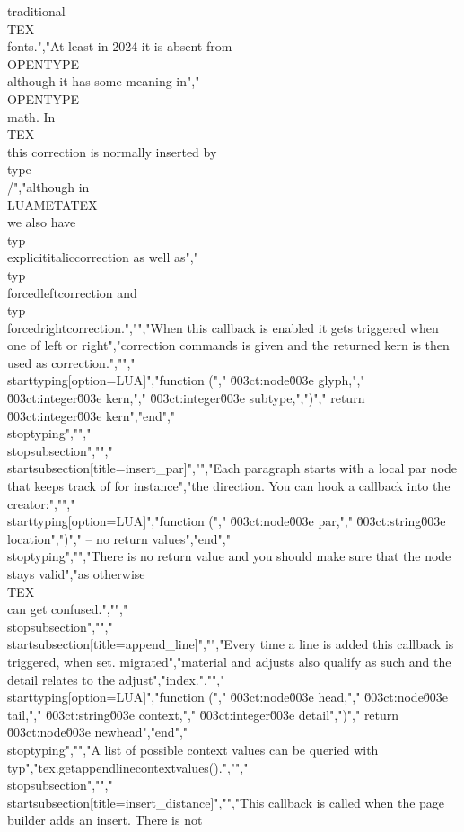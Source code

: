 traditional \\TEX\\ fonts.","At least in 2024 it is absent from \\OPENTYPE\\ although it has some meaning in","\\OPENTYPE\\ math. In \\TEX\\ this correction is normally inserted by \\type {\\/}","although in \\LUAMETATEX\\ we also have \\typ {\\explicititaliccorrection} as well as","\\typ {\\forcedleftcorrection} and \\typ {\\forcedrightcorrection}.","","When this callback is enabled it gets triggered when one of left or right","correction commands is given and the returned kern is then used as correction.","","\\starttyping[option=LUA]","function (","    \u003ct:node\u003e    glyph,","    \u003ct:integer\u003e kern,","    \u003ct:integer\u003e subtype,",")","    return \u003ct:integer\u003e kern","end","\\stoptyping","","\\stopsubsection","","\\startsubsection[title=insert_par]","","Each paragraph starts with a local par node that keeps track of for instance","the direction. You can hook a callback into the creator:","","\\starttyping[option=LUA]","function (","    \u003ct:node\u003e   par,","    \u003ct:string\u003e location",")","    -- no return values","end","\\stoptyping","","There is no return value and you should make sure that the node stays valid","as otherwise \\TEX\\ can get confused.","","\\stopsubsection","","\\startsubsection[title=append_line]","","Every time a line is added this callback is triggered, when set. migrated","material and adjusts also qualify as such and the detail relates to the adjust","index.","","\\starttyping[option=LUA]","function (","    \u003ct:node\u003e    head,","    \u003ct:node\u003e    tail,","    \u003ct:string\u003e  context,","    \u003ct:integer\u003e detail",")","    return \u003ct:node\u003e newhead","end","\\stoptyping","","A list of possible context values can be queried with \\typ","{tex.getappendlinecontextvalues()}.","","\\stopsubsection","","\\startsubsection[title=insert_distance]","","This callback is called when the page builder adds an insert. There is not 